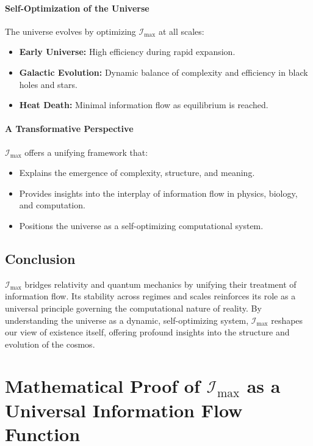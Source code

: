 \documentclass[12pt]{article}
\begin{document}
\paragraph{Self-Optimization of the Universe}
The universe evolves by optimizing \(\mathcal{I}_{\text{max}}\) at all scales:
\begin{itemize}
    \item \textbf{Early Universe:} High efficiency during rapid expansion.
    \item \textbf{Galactic Evolution:} Dynamic balance of complexity and efficiency in black holes and stars.
    \item \textbf{Heat Death:} Minimal information flow as equilibrium is reached.
\end{itemize}

\paragraph{A Transformative Perspective}
\(\mathcal{I}_{\text{max}}\) offers a unifying framework that:
\begin{itemize}
    \item Explains the emergence of complexity, structure, and meaning.
    \item Provides insights into the interplay of information flow in physics, biology, and computation.
    \item Positions the universe as a self-optimizing computational system.
\end{itemize}

\subsection{Conclusion}
\(\mathcal{I}_{\text{max}}\) bridges relativity and quantum mechanics by unifying their treatment of information flow. Its stability across regimes and scales reinforces its role as a universal principle governing the computational nature of reality. By understanding the universe as a dynamic, self-optimizing system, \(\mathcal{I}_{\text{max}}\) reshapes our view of existence itself, offering profound insights into the structure and evolution of the cosmos.


\section{Mathematical Proof of \(\mathcal{I}_{\text{max}}\) as a Universal Information Flow Function}
\end{document}

